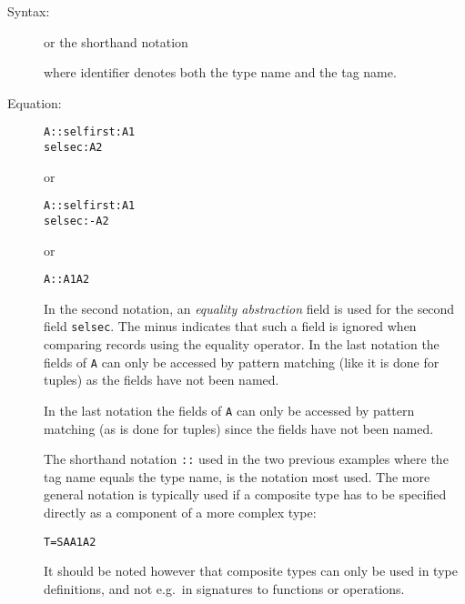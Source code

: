 \documentclass[\pformat,12pt]{article}
\begin{document}
\begin{description}
\item[Syntax:] 
  
  
  
  
  or the shorthand notation
  
  
  where identifier denotes both the type name and the tag name.

\item[Equation:]\mbox{}\label{a-type}
  \begin{alltt}
    A :: selfirst : A1
         selsec   : A2
  \end{alltt}%
\index{\texttt{::}}

  or

  \begin{alltt}
    A :: selfirst :  A1
         selsec   :- A2
  \end{alltt}%
\index{\texttt{:-}}

  or

  \begin{alltt}
    A :: A1 A2
  \end{alltt}

  In the second notation, an {\it equality abstraction\/} field
   is
  used for the second field {\tt selsec}. The minus indicates that
  such a field is ignored when comparing records using the equality
  operator.  In the last notation the fields of {\tt A} can only be
  accessed by pattern matching (like it is done for tuples) as the
  fields have not been named.
  
  In the last notation the fields of {\tt A} can only be accessed by
  pattern matching (as is done for tuples) since the fields have not
  been named.

  The shorthand notation {\tt ::} used in the two previous examples
   where the tag name equals the type
  name, is the notation most used.
  The more general  notation is typically used if a
  composite type has to be specified directly as a component of a more
  complex type:
  \begin{alltt}
    T =  S  A  A1 A2 
  \end{alltt}
  It should be noted however that composite types can only be used in
  type definitions, and not e.g.\ in signatures to functions or
  operations. 


\end{description}
\end{document}
